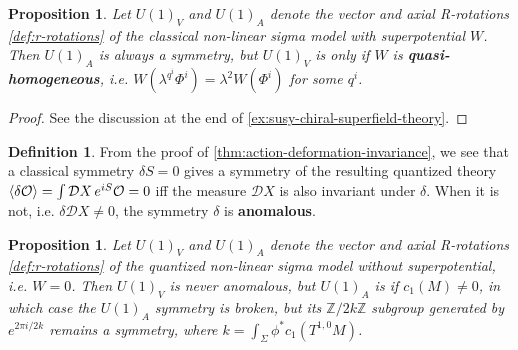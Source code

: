 \documentclass{report}
\theoremstyle{plain}
\newtheorem{proposition}[theorem]{Proposition}
\theoremstyle{definition}
\newtheorem{definition}[theorem]{Definition}
\theoremstyle{remark}
\newcommand{\bZ}{\mathbb{Z}}
\newcommand{\cD}{\mathcal{D}}
\newcommand{\cO}{\mathcal{O}}
\begin{document}
\begin{proposition}
  Let $U(1)_V$ and $U(1)_A$ denote the vector and axial R-rotations
  \ref{def:r-rotations} of the classical non-linear sigma model with
  superpotential $W$. Then $U(1)_A$ is always a symmetry, but $U(1)_V$
  is only if $W$ is {\bf quasi-homogeneous}, i.e.
  $W(\lambda^{q^i}\Phi^i) = \lambda^2 W(\Phi^i)$ for some $q^i$.
\end{proposition}

\begin{proof}
  See the discussion at the end of
  \ref{ex:susy-chiral-superfield-theory}.
\end{proof}

\begin{definition}
  From the proof of \ref{thm:action-deformation-invariance}, we see
  that a classical symmetry $\delta S = 0$ gives a symmetry of the
  resulting quantized theory $\braket{\delta \cO} = \int \cD X \,
  e^{iS} \cO = 0$ iff the measure $\cD X$ is also invariant under
  $\delta$. When it is not, i.e. $\delta \cD X \neq 0$, the symmetry
  $\delta$ is {\bf anomalous}.
\end{definition}

\begin{proposition}
  Let $U(1)_V$ and $U(1)_A$ denote the vector and axial R-rotations
  \ref{def:r-rotations} of the quantized non-linear sigma model
  without superpotential, i.e. $W = 0$. Then $U(1)_V$ is never
  anomalous, but $U(1)_A$ is if $c_1(M) \neq 0$, in which case the
  $U(1)_A$ symmetry is broken, but its $\bZ/2k\bZ$ subgroup generated
  by $e^{2\pi i/2k}$ remains a symmetry, where $k = \int_\Sigma
  \phi^*c_1(T^{1,0}M)$.
\end{proposition}
\end{document}
